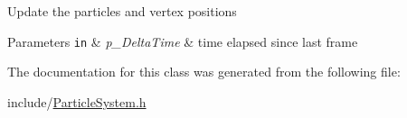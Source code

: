 Update the particles and vertex positions 
\begin{DoxyParams}[1]{Parameters}
\mbox{\tt in}  & {\em p\+\_\+\+Delta\+Time} & time elapsed since last frame \\
\hline
\end{DoxyParams}


The documentation for this class was generated from the following file\+:\begin{DoxyCompactItemize}
\item 
include/\hyperlink{_particle_system_8h}{Particle\+System.\+h}\end{DoxyCompactItemize}
